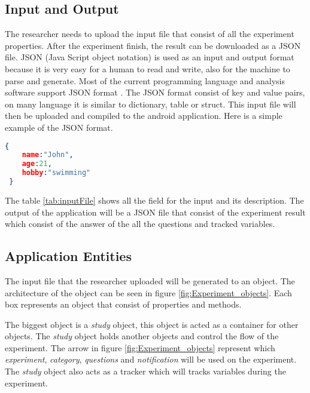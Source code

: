 \subsection{Input and Output}


The researcher needs to upload the input file that consist of all the experiment properties. After the experiment finish, the result can be downloaded as a JSON file.
JSON (Java Script object notation) is used as an input and output format because it is very easy for a human to read and write, also for the machine to parse and generate.
Most of the current programming language and analysis software support JSON format \citep{jsonDesc}.
The JSON format consist of key and value pairs, on many language it is similar to dictionary, table or struct. This input file will then be uploaded and compiled to the android application.
Here is a simple example of the JSON format. 
\begin{lstlisting}[language=json,firstnumber=1]
 {
    name:"John",
    age:21,
    hobby:"swimming"
 }
\end{lstlisting}
The table \ref{tab:inputFile} shows all the field for the input and its description. The output of the application will be a JSON file that consist of the experiment result
which consist of the answer of the all the questions and tracked variables.



\subsection{Application Entities}
The input file that the researcher uploaded will be generated to an object.
The architecture of the object can be seen in figure \ref{fig:Experiment_objects}.
 Each box represents an object that consist of properties and methods.


 The biggest object is a \textit{study} object, this object is acted as a container for other objects.
The \textit{study} object holds another objects and control the flow of the experiment. The arrow in figure \ref{fig:Experiment_objects} represent which \textit{experiment}, \textit{category},
\textit{questions} and \textit{notification} will be used on the experiment. The \textit{study} object also acts as a tracker which will tracks variables during the experiment.

